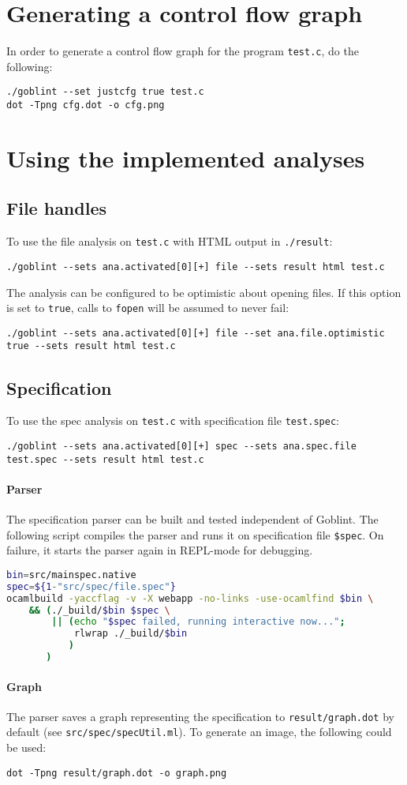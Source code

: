 \section{Generating a control flow graph}
In order to generate a control flow graph for the program \verb|test.c|, do the following:
\begin{lstlisting}
./goblint --set justcfg true test.c
dot -Tpng cfg.dot -o cfg.png 
\end{lstlisting}


\section{Using the implemented analyses}
\label{sec:app:use_ana}
\subsection{File handles}
To use the file analysis on \verb|test.c| with HTML output in \verb|./result|:
\begin{lstlisting}
./goblint --sets ana.activated[0][+] file --sets result html test.c
\end{lstlisting}
The analysis can be configured to be optimistic about opening files. If this option is set to \verb|true|, calls to \verb|fopen| will be assumed to never fail:
\begin{lstlisting}
./goblint --sets ana.activated[0][+] file --set ana.file.optimistic true --sets result html test.c
\end{lstlisting}

\subsection{Specification}
To use the spec analysis on \verb|test.c| with specification file \verb|test.spec|:
\begin{lstlisting}
./goblint --sets ana.activated[0][+] spec --sets ana.spec.file test.spec --sets result html test.c
\end{lstlisting}
\paragraph*{Parser}
The specification parser can be built and tested independent of Goblint. The following script compiles the parser and runs it on specification file \verb|$spec|. On failure, it starts the parser again in REPL-mode for debugging.
\begin{lstlisting}[language=bash]
bin=src/mainspec.native
spec=${1-"src/spec/file.spec"}
ocamlbuild -yaccflag -v -X webapp -no-links -use-ocamlfind $bin \
    && (./_build/$bin $spec \
        || (echo "$spec failed, running interactive now...";
            rlwrap ./_build/$bin
           )
       )
\end{lstlisting}
\paragraph*{Graph}
The parser saves a graph representing the specification to \verb|result/graph.dot| by default (see \verb|src/spec/specUtil.ml|).
To generate an image, the following could be used:
\begin{lstlisting}
dot -Tpng result/graph.dot -o graph.png 
\end{lstlisting}
